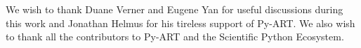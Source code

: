 \documentclass[twocol]{ametsoc}
\begin{document}
 We wish to thank Duane Verner and Eugene Yan for useful discussions during this work and Jonathan Helmus for his tireless support 
 of Py-ART. We also wish to thank all the contributors to Py-ART and the Scientific Python Ecosystem. 
%
%
%







\end{document}
